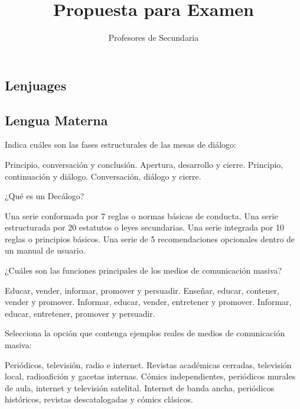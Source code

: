 \documentclass[12pt]{evaluasep}
\title{Propuesta para Examen}
\author{Profesores de Secundaria}
\begin{document}
%
	\tableofcontents
\vfill
\newpage
\begin{questions}
		\section{Lenjuages}
                \subsection{Lengua Materna}

				\question Indica cuáles son las fases estructurales de las mesas de diálogo:
    \begin{choices}
        \choice Principio, conversación y conclusión.
        \CorrectChoice Apertura, desarrollo y cierre.
        \choice Principio, continuación y diálogo.
        \choice Conversación, diálogo y cierre.
    \end{choices}
    

    \question ¿Qué es un Decálogo?
    \begin{choices}
        \choice Una serie conformada por 7 reglas o normas básicas de conducta.
        \choice Una serie estructurada por 20 estatutos o leyes secundarias.
        \CorrectChoice Una serie integrada por 10 reglas o principios básicos.
        \choice Una serie de 5 recomendaciones opcionales dentro de un manual de usuario.
    \end{choices}
    

    \question ¿Cuáles son las funciones principales de los medios de comunicación masiva?
    \begin{choices}
        \choice Educar, vender, informar, promover y persuadir.
        \choice Enseñar, educar, contener, vender y promover.
        \choice Informar, educar, vender, entretener y promover.
        \CorrectChoice Informar, educar, entretener, promover y persuadir.
    \end{choices}
    

    \question Selecciona la opción que contenga ejemplos reales de medios de comunicación masiva:
    \begin{choices}
        \CorrectChoice Periódicos, televisión, radio e internet.
        \choice Revistas académicas cerradas, televisión local, radioafición y gacetas internas.
        \choice Cómics independientes, periódicos murales de aula, internet y televisión satelital.
        \choice Internet de banda ancha, periódicos históricos, revistas descatalogadas y cómics clásicos.
    \end{choices}
    


\end{questions}
\end{document}
